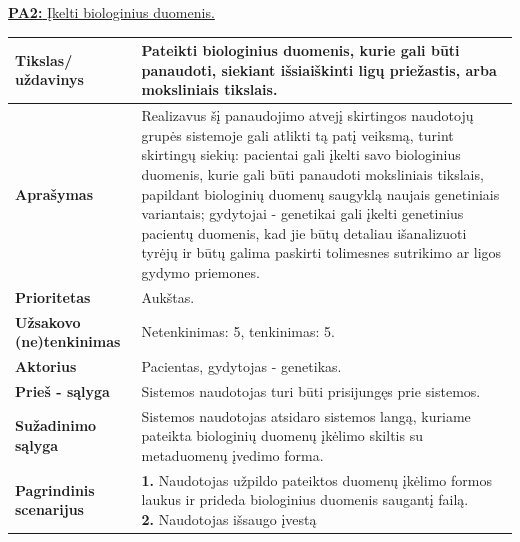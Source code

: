 \documentclass[12pt]{article}
\begin{document}
\noindent \hypertarget{FR2}{\hyperlink{PA2}{\textbf{PA2:} Įkelti biologinius
duomenis.}}
\label{sec:FR2}
\begin{table}[htb!]
    \captionsetup{justification=centering}
    \begin{tabular}{|m{3cm}|m{13.7cm}|}
        \hline
        \raggedleft \textbf{\cellcolor{deepchampagne}Tikslas/ uždavinys} &
        Pateikti biologinius duomenis, kurie gali būti panaudoti, siekiant
        išsiaiškinti ligų priežastis, arba moksliniais tikslais. \\
        \hline
        \raggedleft \textbf{\cellcolor{deepchampagne}Aprašymas} &
        Realizavus šį panaudojimo atvejį skirtingos naudotojų grupės sistemoje
        gali atlikti tą patį veiksmą, turint skirtingų siekių: pacientai gali
        įkelti savo biologinius duomenis, kurie gali būti panaudoti moksliniais
        tikslais, papildant biologinių duomenų saugyklą naujais genetiniais
        variantais; gydytojai - genetikai gali įkelti genetinius pacientų
        duomenis, kad jie būtų detaliau išanalizuoti tyrėjų ir būtų galima
        paskirti tolimesnes sutrikimo ar ligos gydymo priemones. \\
        \hline
        \raggedleft \textbf{\cellcolor{deepchampagne}Prioritetas} & Aukštas. \\
        \hline
        \raggedleft \textbf{\cellcolor{deepchampagne}Užsakovo (ne)tenkinimas} &
        Netenkinimas: 5, tenkinimas: 5. \\
        \hline
        \raggedleft \textbf{\cellcolor{deepchampagne}Aktorius} &
        Pacientas, gydytojas - genetikas. \\
        \hline
        \raggedleft \textbf{\cellcolor{deepchampagne}Prieš - sąlyga} &
        Sistemos naudotojas turi būti prisijungęs prie sistemos. \\
        \hline
        \raggedleft \textbf{\cellcolor{deepchampagne}Sužadinimo sąlyga} &
        Sistemos naudotojas atsidaro sistemos langą, kuriame pateikta
        biologinių duomenų įkėlimo skiltis su metaduomenų įvedimo forma. \\
        \hline
        \raggedleft \textbf{\cellcolor{deepchampagne}Pagrindinis
        scenarijus} & \vskip 5pt
        \makecell[l]{\parbox[t]{13.7cm}{
            \textbf{1.} \textcolor{dartmouthgreen}{Naudotojas užpildo pateiktos
            duomenų įkėlimo formos laukus ir prideda biologinius duomenis
            saugantį failą.} \\
            \textbf{2.} \textcolor{dartmouthgreen}{Naudotojas išsaugo įvestą
}}}
\end{tabular}
\end{table}
\end{document}
